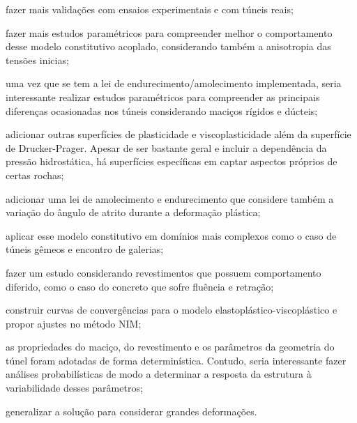 \begin{alineas}
	
	\item fazer mais validações com ensaios experimentais e com túneis reais;
	
	\item fazer mais estudos paramétricos para compreender melhor o comportamento desse modelo constitutivo acoplado, considerando também a anisotropia das tensões inicias;
	
	\item uma vez que se tem a lei de endurecimento/amolecimento implementada, seria interessante realizar estudos paramétricos para compreender as principais diferenças ocasionadas nos túneis considerando maciços rígidos e dúcteis;
	
	\item adicionar outras superfícies de plasticidade e viscoplasticidade além da superfície de Drucker-Prager. Apesar de ser bastante geral e incluir a dependência da pressão hidrostática, há superfícies específicas em captar aspectos próprios de certas rochas;
	
	\item adicionar uma lei de amolecimento e endurecimento que considere também a variação do ângulo de atrito durante a deformação plástica;
	
	\item aplicar esse modelo constitutivo em domínios mais complexos como o caso de túneis gêmeos e encontro de galerias;
	
	\item fazer um estudo considerando revestimentos que possuem comportamento diferido, como o caso do concreto que sofre fluência e retração;
	
	\item construir curvas de convergências para o modelo elastoplástico-viscoplástico e propor ajustes no método NIM;
	
	\item as propriedades do maciço, do revestimento e os parâmetros da geometria do túnel foram adotadas de forma determinística. Contudo, seria interessante fazer análises probabilísticas de modo a determinar a resposta da estrutura à variabilidade desses parâmetros;
	
	\item generalizar a solução para considerar grandes deformações.	
	
\end{alineas}